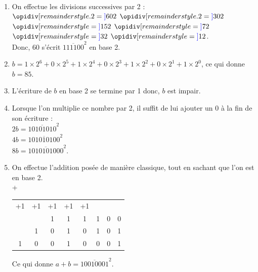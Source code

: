 \begin{corrige}
\ \\ [-5mm]
   \begin{enumerate}
      \item On effectue les divisions successives par 2 : \\ [1mm]
      $\opidiv[remainderstyle.2=\textcolor{blue}]{60}{2}$ \quad $\opidiv[remainderstyle.2=\textcolor{blue}]{30}{2}$ \quad $\opidiv[remainderstyle=\textcolor{blue}]{15}{2}$ \quad $\opidiv[remainderstyle=\textcolor{blue}]{7}{2}$ \quad $\opidiv[remainderstyle=\textcolor{blue}]{3}{2}$ \quad $\opidiv[remainderstyle=\textcolor{blue}]{1}{2}$. \\ [1mm]
         Donc, 60 s'écrit {\blue $\overline{111100}^2$} en base 2. \\
      \item $b =1\times2^6+0\times2^5+1\times2^4+0\times2^3+1\times2^2+0\times2^1+1\times2^0$, ce qui donne {\blue $b = 85$}.
      \item L'écriture de $b$ en base 2 se termine par 1 donc, {\blue $b$ est impair}.
      \item Lorsque l'on multiplie ce nombre par 2, il suffit de lui ajouter un 0 à la fin de son écriture : \\
         {\blue $2b =\overline{10101010}^2$} \\
         {\blue $4b =\overline{101010100}^2$} \\
         {\blue $8b =\overline{1010101000}^2$}.
       \item On effectue l'addition posée de manière classique, tout en sachant que l'on est en base 2. \\ \hspace*{1cm} +\begin{tabular}{cccccccc}
            \tiny +1 & \tiny +1 & \tiny +1 & \tiny +1 & \tiny +1 & & & \\
            & & 1 & 1 & 1 & 1 & 0 & 0 \\
            & 1 & 0 & 1 & 0 & 1 & 0 & 1 \\
            \hline
            1 & 0 & 0 & 1 & 0 & 0 & 0 & 1 \\
         \end{tabular}
   \qquad Ce qui donne {\blue $a+b =\overline{10010001}^2$}.
   \end{enumerate}
\end{corrige}


\bigskip


